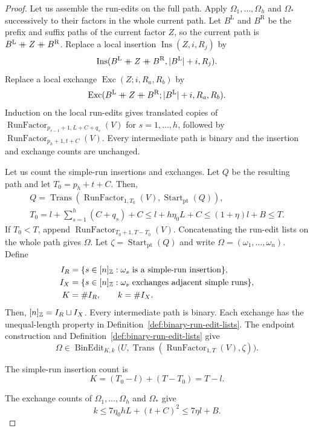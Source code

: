 \begin{proof}
Let us assemble the run-edits on the full path.
Apply $\Omega_1,\ldots,\Omega_h$ and $\Omega_*$ successively to their factors in the whole current path.
Let $B^{\mathrm L}$ and $B^{\mathrm R}$ be the prefix and suffix paths of the current factor $Z$, so the current path is $B^{\mathrm L}\mathbin{+\mkern-10mu+} Z\mathbin{+\mkern-10mu+} B^{\mathrm R}$.
Replace a local insertion $\operatorname{Ins}(Z,i,R_j)$ by
\[
 \operatorname{Ins}(B^{\mathrm L}\mathbin{+\mkern-10mu+} Z\mathbin{+\mkern-10mu+} B^{\mathrm R},|B^{\mathrm L}|+i,R_j).
\]
Replace a local exchange $\operatorname{Exc}(Z;i,R_a,R_b)$ by
\[
 \operatorname{Exc}(B^{\mathrm L}\mathbin{+\mkern-10mu+} Z\mathbin{+\mkern-10mu+} B^{\mathrm R};|B^{\mathrm L}|+i,R_a,R_b).
\]
Induction on the local run-edits gives translated copies of $\operatorname{RunFactor}_{p_{s-1}+1,L+C+q_s}(V)$ for $s=1,\ldots,h$, followed by $\operatorname{RunFactor}_{p_h+1,t+C}(V)$.
Every intermediate path is binary and the insertion and exchange counts are unchanged.

Let us count the simple-run insertions and exchanges.
Let $Q$ be the resulting path and let $T_0=p_h+t+C$.
Then,
\[
\begin{gathered}
 Q=\operatorname{Trans}(\operatorname{RunFactor}_{1,T_0}(V),\operatorname{Start}_{\mathrm{pt}}(Q)),\\
 T_0=l+\sum_{s=1}^h(C+q_s)+C
 \le l+h\eta_0 L+C\le(1+\eta)l+B\le T.
\end{gathered}
\]
If $T_0<T$, append $\operatorname{RunFactor}_{T_0+1,T-T_0}(V)$.
Concatenating the run-edit lists on the whole path gives $\Omega$.
Let $\zeta=\operatorname{Start}_{\mathrm{pt}}(Q)$ and write $\Omega=(\omega_1,\ldots,\omega_n)$.
Define
\[
\begin{aligned}
 I_R&=\{s\in[n]_{\mathbb Z}:\omega_s\text{ is a simple-run insertion}\},\\
 I_X&=\{s\in[n]_{\mathbb Z}:\omega_s\text{ exchanges adjacent simple runs}\},\\
 K&=\#I_R,\qquad k=\#I_X.
\end{aligned}
\]
Then, $[n]_{\mathbb Z}=I_R\sqcup I_X$.
Every intermediate path is binary. Each exchange has the unequal-length property in Definition~\ref{def:binary-run-edit-lists}.
The endpoint construction and Definition~\ref{def:binary-run-edit-lists} give
\[
 \Omega\in\operatorname{BinEdit}_{K,k}
 \bigl(U,\operatorname{Trans}(\operatorname{RunFactor}_{1,T}(V),\zeta)\bigr).
\]

The simple-run insertion count is
\[
 K=(T_0-l)+(T-T_0)=T-l.
\]

The exchange counts of $\Omega_1,\ldots,\Omega_h$ and $\Omega_*$ give
\[
 k\le7\eta_0 hL+(t+C)^2\le7\eta l+B.
\]
\end{proof}

